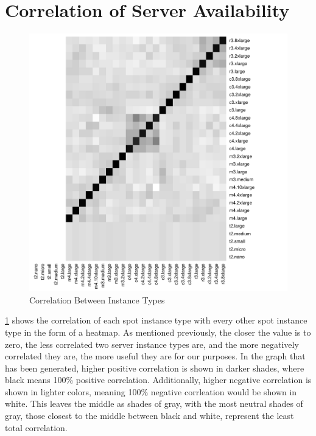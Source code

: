 \documentclass[thesis,proposal]{umassthesis}  %
\begin{document}
\section{Correlation of Server Availability}

\begin{figure}
	\begin{center}
    	\includegraphics{CorrelationHeatMap}
        \caption{Correlation Between Instance Types}\label{fig:corr}
	\end{center}
\end{figure}

\ref{fig:corr} shows the correlation of each spot instance type with every other spot instance type in the form of a heatmap. As mentioned previously, the closer the value is to zero, the less correlated two server instance types are, and the more negatively correlated they are, the more useful they are for our purposes. In the graph that has been generated, higher positive correlation is shown in darker shades, where black means 100\% positive correlation. Additionally, higher negative correlation is shown in lighter colors, meaning 100\% negative corrleation would be shown in white. This leaves the middle as shades of gray, with the most neutral shades of gray, those closest to the middle between black and white, represent the least total correlation.\par
\end{document}

